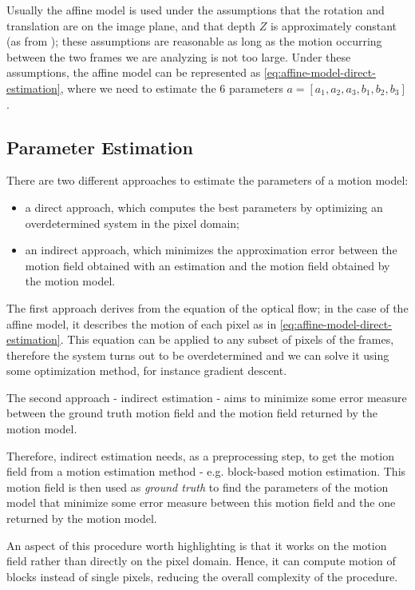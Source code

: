 Usually the affine model is used under the assumptions that the rotation and translation are on the image plane, and that depth $Z$ is approximately constant (as from \cite{WangBook}); these assumptions are reasonable as long as the motion occurring between the two frames we are analyzing is not too large.
Under these assumptions, the affine model can be represented as \cref{eq:affine-model-direct-estimation}, where we need to estimate the 6 parameters $a =[a_1, a_2, a_3, b_1, b_2, b_3 ]$.



\subsection{Parameter Estimation}
There are two different approaches to estimate the parameters of a motion model:
\begin{itemize}
    \item a direct approach, which computes the best parameters by optimizing an overdetermined system in the pixel domain;
    \item an indirect approach, which minimizes the approximation error between the motion field obtained with an estimation and the motion field obtained by the motion model.
\end{itemize}

The first approach derives from the equation of the optical flow; in the case of the affine model, it describes the motion of each pixel as in \cref{eq:affine-model-direct-estimation}.
This equation can be applied to any subset of pixels of the frames, therefore the system turns out to be overdetermined and we can solve it using some optimization method, for instance gradient descent.

The second approach - indirect estimation - aims to minimize some error measure between the ground truth motion field and the motion field returned by the motion model.

Therefore, indirect estimation needs, as a preprocessing step, to get the motion field from a motion estimation method - e.g. block-based motion estimation. This motion field is then used as \textit{ground truth} to find the parameters of the motion model that minimize some error measure between this motion field and the one returned by the motion model.

An aspect of this procedure worth highlighting is that it works on the motion field rather than directly on the pixel domain. Hence, it can compute motion of blocks instead of single pixels, reducing the overall complexity of the procedure.

